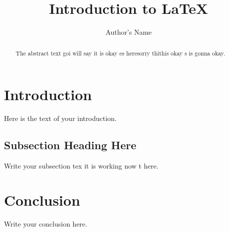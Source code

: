 \documentclass{article}
\begin{document}
\title{Introduction to \LaTeX{}}
\author{Author's Name}
\maketitle
\begin{abstract}
The abstract text goi will say it is okay es heresorry thithis okay s is gonna okay.
\end{abstract}
\section{Introduction}
Here is the text of your introduction.
\subsection{Subsection Heading Here}
Write your subsection tex it is working now t here.
\section{Conclusion}
Write your conclusion here.
\end{document}
